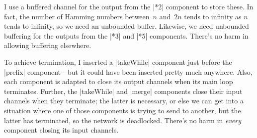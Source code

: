 \begin{answerI}
I use a buffered channel for the output from the |*2| component to store
these.  In fact, the number of Hamming numbers between~$n$ and~$2n$ tends to
infinity as $n$ tends to infinity, so we need an unbounded buffer.  Likewise,
we need unbounded buffering for the outputs from  the |*3| and |*5|
components.  There's no harm in allowing buffering elsewhere.  

To achieve termination, I inserted a |takeWhile| component just before the
|prefix| component---but it could have been inserted pretty much anywhere.
Also, each component is adapted to close its output channels when its main
loop terminates.  Further, the |takeWhile| and |merge| components close their
input channels when they terminate; the latter is necessary, or else we can
get into a situation where one of those components is trying to send to
another, but the latter has terminated, so the network is deadlocked.  There's
no harm in \emph{every} component closing its input channels.
\end{answerI}
